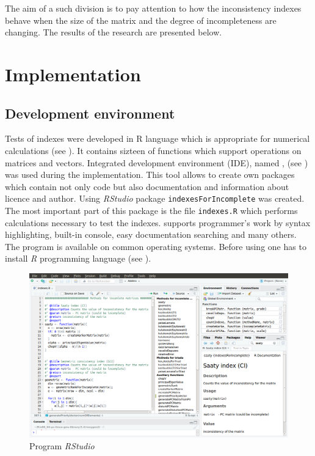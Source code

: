 The aim of a such division is to pay attention to how the inconsistency indexes behave when the size of the matrix and the degree of incompleteness are changing. The results of the research are presented below.


\section{Implementation}

\subsection{Development environment}
Tests of indexes were developed in R language which is appropriate for numerical calculations (see \cite{projectR}). It contains sizteen of functions which support operations on matrices and vectors. Integrated development environment (IDE), named , (see \cite{studioR}) was used during the implementation. This tool allows to create own packages which contain not only code but also documentation and information about licence and author. Using \textit{RStudio} package \texttt{indexesForIncomplete} was created. The most important part of this package is the file \texttt{indexes.R} which performs calculations necessary to test the indexes.  supports programmer's work by syntax highlighting, built-in console, easy documentation searching and many others. The program is available on common operating systems. Before using  one has to install \textit{R} programming language (see \cite{installR}).  



\begin{figure}[h]
\centerline{\includegraphics[width=\textwidth]{images/rstudio.png}}
\caption{Program \textit{RStudio}}
\label{fig:rstudio}
\end{figure}

